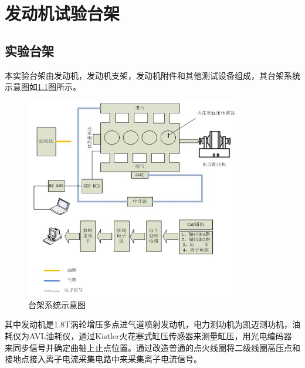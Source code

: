 \chapter{发动机试验台架}
\section{实验台架}
本实验台架由发动机，发动机支架，发动机附件和其他测试设备组成，其台架系统示意图如\ref{fig:platformintro}图所示。\par
\begin{figure}[!h]
	\centering
	\includegraphics[width=0.85\textwidth]{thesis_figure/platformer_chapter/platformer_intro}
	\caption{台架系统示意图}
	\label{fig:platformintro}
\end{figure}
其中发动机是1.8T涡轮增压多点进气道喷射发动机，电力测功机为凯迈测功机，油耗仪为AVL油耗仪，通过Kistler火花塞式缸压传感器来测量缸压，用光电编码器
来同步信号并确定曲轴上止点位置。通过改造普通的点火线圈将二级线圈高压点和接地点接入离子电流采集电路中来采集离子电流信号。

